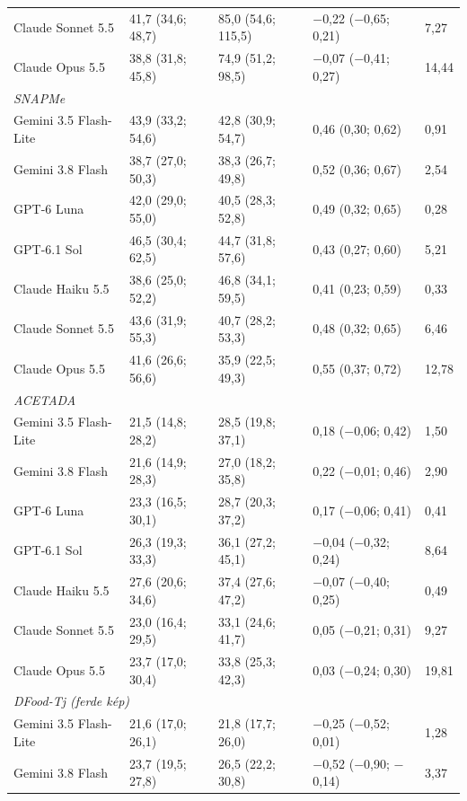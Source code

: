 \begin{table}[p]
{\begin{tabular}{lllll}
Claude Sonnet 5.5 & 41,7 (34,6; 48,7) & 85,0 (54,6; 115,5) & $-$0,22 ($-$0,65; 0,21) & 7,27 \\
Claude Opus 5.5 & 38,8 (31,8; 45,8) & 74,9 (51,2; 98,5) & $-$0,07 ($-$0,41; 0,27) & 14,44 \\
\hline
\multicolumn{5}{l}{\textit{SNAPMe}} \\
Gemini 3.5 Flash-Lite & 43,9 (33,2; 54,6) & 42,8 (30,9; 54,7) & 0,46 (0,30; 0,62) & 0,91 \\
Gemini 3.8 Flash & 38,7 (27,0; 50,3) & 38,3 (26,7; 49,8) & 0,52 (0,36; 0,67) & 2,54 \\
GPT-6 Luna & 42,0 (29,0; 55,0) & 40,5 (28,3; 52,8) & 0,49 (0,32; 0,65) & 0,28 \\
GPT-6.1 Sol & 46,5 (30,4; 62,5) & 44,7 (31,8; 57,6) & 0,43 (0,27; 0,60) & 5,21 \\
Claude Haiku 5.5 & 38,6 (25,0; 52,2) & 46,8 (34,1; 59,5) & 0,41 (0,23; 0,59) & 0,33 \\
Claude Sonnet 5.5 & 43,6 (31,9; 55,3) & 40,7 (28,2; 53,3) & 0,48 (0,32; 0,65) & 6,46 \\
Claude Opus 5.5 & 41,6 (26,6; 56,6) & 35,9 (22,5; 49,3) & 0,55 (0,37; 0,72) & 12,78 \\
\hline
\multicolumn{5}{l}{\textit{ACETADA}} \\
Gemini 3.5 Flash-Lite & 21,5 (14,8; 28,2) & 28,5 (19,8; 37,1) & 0,18 ($-$0,06; 0,42) & 1,50 \\
Gemini 3.8 Flash & 21,6 (14,9; 28,3) & 27,0 (18,2; 35,8) & 0,22 ($-$0,01; 0,46) & 2,90 \\
GPT-6 Luna & 23,3 (16,5; 30,1) & 28,7 (20,3; 37,2) & 0,17 ($-$0,06; 0,41) & 0,41 \\
GPT-6.1 Sol & 26,3 (19,3; 33,3) & 36,1 (27,2; 45,1) & $-$0,04 ($-$0,32; 0,24) & 8,64 \\
Claude Haiku 5.5 & 27,6 (20,6; 34,6) & 37,4 (27,6; 47,2) & $-$0,07 ($-$0,40; 0,25) & 0,49 \\
Claude Sonnet 5.5 & 23,0 (16,4; 29,5) & 33,1 (24,6; 41,7) & 0,05 ($-$0,21; 0,31) & 9,27 \\
Claude Opus 5.5 & 23,7 (17,0; 30,4) & 33,8 (25,3; 42,3) & 0,03 ($-$0,24; 0,30) & 19,81 \\
\hline
\multicolumn{5}{l}{\textit{DFood-Tj (ferde kép)}} \\
Gemini 3.5 Flash-Lite & 21,6 (17,0; 26,1) & 21,8 (17,7; 26,0) & $-$0,25 ($-$0,52; 0,01) & 1,28 \\
Gemini 3.8 Flash & 23,7 (19,5; 27,8) & 26,5 (22,2; 30,8) & $-$0,52 ($-$0,90; $-$0,14) & 3,37 \\

\end{tabular}}
\end{table}
